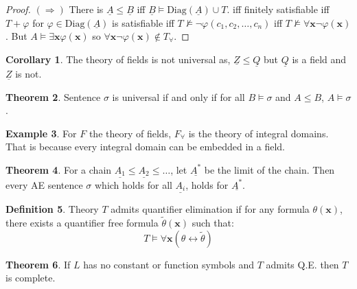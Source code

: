 \documentclass[a4paper,10pt]{article}
\theoremstyle{definition}
\newtheorem{theorem}{Theorem}
\newtheorem{definition}[theorem]{Definition}
\newtheorem{example}[theorem]{Example}
\newtheorem{corollary}[theorem]{Corollary}
\let\vec\mathbf
\let\phi\varphi
\let\leq\leqslant
\begin{document}
\begin{proof}
    $(\Rightarrow)$ There is $\underline{A} \leq \underline{B}$ iff $\underline{B} \models \mathrm{Diag}(\underline{A}) \cup T$. iff finitely satisfiable iff $T + \phi$ for $\phi \in \mathrm{Diag}(\underline{A})$ is satisfiable iff $T \nvDash \neg \phi(c_1, c_2, \ldots, c_n)$ iff $T \nvDash \forall \vec{x} \neg \phi(\vec{x}) $. But $A \models \exists \vec{x} \phi(\vec{x})$ so $\forall \vec{x} \neg \phi(\vec{x}) \notin T_\forall$.
\end{proof}


\begin{corollary}
    The theory of fields is not universal as, $\underline{Z} \leqslant \underline{Q}$ but $\underline{Q}$ is a field and $\underline{Z}$ is not.
\end{corollary}

\begin{theorem}
    Sentence $\sigma$ is universal if and only if for all $B \models \sigma$ and $A \leqslant B$, $A \models \sigma$.
\end{theorem}

\begin{example}
    For $F$ the theory of fields, $F_\forall$ is the theory of integral domains.
    That is because every integral domain can be embedded in a field.
\end{example}

\begin{theorem}
    For a chain $\underline{A_1} \leqslant \underline{A_2} \leqslant \ldots$, let $\underline{A^*}$ be the limit of the chain. Then every AE sentence $\sigma$ which holds for all $\underline{A_i}$, holds for $\underline{A^*}$.
\end{theorem}

\begin{definition}
    Theory $T$ admits quantifier elimination if for any formula $\theta(\vec{x})$, there exists a quantifier free formula $\tilde{\theta}(\vec{x})$ such that:
    \[
        T \models \forall \vec{x} (\theta \leftrightarrow \tilde{\theta})
    \]
\end{definition}

\begin{theorem}
    If $L$ has no constant or function symbols and $T$ admits Q.E. then $T$ is complete.
\end{theorem}
\end{document}
